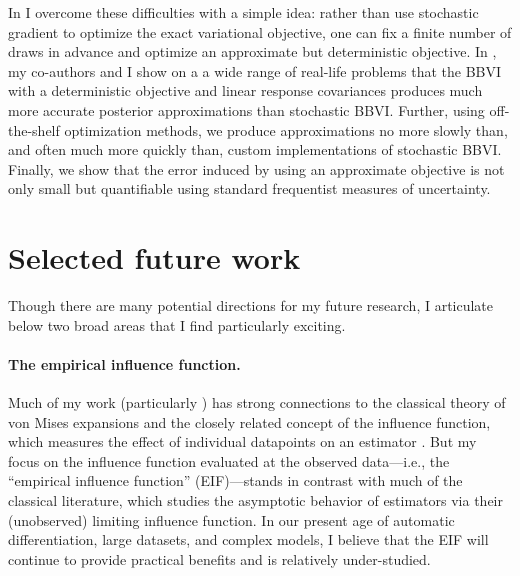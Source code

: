 In \citet{giordano:2018:covariances, giordano:2021:bbvi} I overcome these
difficulties with a simple idea: rather than use stochastic gradient to optimize
the exact variational objective, one can fix a finite number of draws in advance
and optimize an approximate but deterministic objective.  In
\citet{giordano:2021:bbvi}, my co-authors and I show on a a wide range of
real-life problems that the BBVI with a deterministic objective and linear
response covariances produces much more accurate posterior approximations than
stochastic BBVI.  Further, using off-the-shelf optimization methods, we produce
approximations no more slowly than, and often much more quickly than, custom
implementations of stochastic BBVI.  Finally, we show that the error induced by
using an approximate objective is not only small but quantifiable using standard
frequentist measures of uncertainty.




\section{Selected future work}

Though there are many potential directions for my future research, I articulate
below two broad areas that I find particularly exciting.

\paragraph{The empirical influence function.}
%
Much of my work (particularly \citet{giordano:2019:ij, giordano:2020:amip,
giordano:2021:bayesij}) has strong connections to the classical theory of von
Mises expansions and the closely related concept of the influence function,
which measures the effect of individual datapoints on an estimator
\citep{mises:1947:asymptotic, reeds:1976:thesis, hampel:1986:robustbook,
serfling:2009:approximation}.  But my focus on the influence function
evaluated at the observed data---i.e., the ``empirical influence function''
(EIF)---stands in contrast with much of the classical literature, which studies
the asymptotic behavior of estimators via their (unobserved) limiting influence
function.
%
In our present age of automatic differentiation, large datasets, and complex
models, I believe that the EIF will continue to provide practical benefits and
is relatively under-studied.

